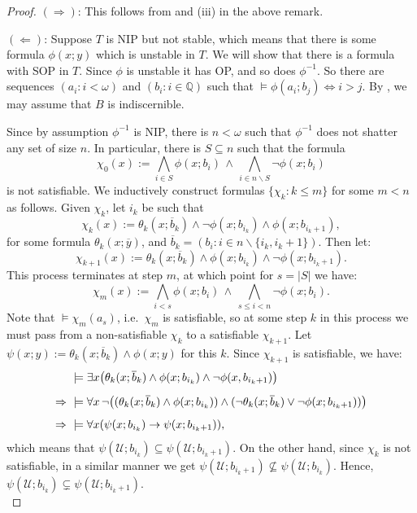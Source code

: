 \documentclass[a4paper]{report}
\newcommand{\Q}{\mathbb{Q}}
\newcommand{\U}{\mathcal{U}}
\newcommand{\y}{\overline{y}}
\renewcommand{\b}{\overline{b}}
\renewcommand{\implies}{\Rightarrow}
\newcommand{\simplies}{\rightarrow}
\renewcommand{\iff}{\Leftrightarrow}
\theoremstyle{definition}
\theoremstyle{remstyle}
\begin{document}
\begin{proof}
	$(\implies)$: This follows from  and (iii) in the above remark.

	$(\Leftarrow)$: Suppose $T$ is NIP but not stable, which means that there is some formula $\phi(x;y)$ which is unstable in $T$. We will show that there is a formula with SOP in $T$. Since $\phi$ is unstable it has OP, and so does $\phi^{-1}$. So there are sequences $(a_i:i<\omega)$ and $(b_i:i\in \Q)$ such that $\models \phi(a_i;b_j)\iff i>j$. By , we may assume that $B$ is indiscernible.

	Since by assumption $\phi^{-1}$ is NIP, there is $n<\omega$ such that $\phi^{-1}$ does not shatter any set of size $n$. In particular, there is $S\subseteq n$ such that the formula
	\begin{equation*}
		\chi_0(x) := \bigwedge_{i\in S}\phi(x;b_i)\, \wedge\, \bigwedge_{i\in n\backslash S} \neg\phi(x;b_i)
	\end{equation*}
	is not satisfiable. We inductively construct formulas $\{\chi_k:k\leq m\}$ for some $m<n$ as follows. Given $\chi_k$, let $i_k$ be such that
	\begin{equation*}
		\chi_k(x) := \theta_k(x;\b_k)\wedge \neg\phi(x;b_{i_k}) \wedge \phi(x;b_{i_k+1}),
	\end{equation*}
	for some formula $\theta_k(x;\y)$, and $\b_k=(b_i:i\in n\backslash\{i_k,i_k+1\})$. Then let:
	\begin{equation*}
		\chi_{k+1}(x) := \theta_k(x;\b_k)\wedge \phi(x;b_{i_k}) \wedge \neg\phi(x;b_{i_k+1}).
	\end{equation*}
	This process terminates at step $m$, at which point for $s=|S|$ we have:
	\begin{equation*}
		\chi_m(x) := \bigwedge_{i< s} \phi(x;b_i)\, \wedge\, \bigwedge_{s\leq i<n}\neg\phi(x;b_i).
	\end{equation*}
	Note that $\models\chi_m(a_s)$, i.e.\ $\chi_m$ is satisfiable, so at some step $k$ in this process we must pass from a non-satisfiable $\chi_k$ to a satisfiable $\chi_{k+1}$. Let $\psi(x;y) :=\theta_k(x;\b_k)\wedge\phi(x;y)$ for this $k$. Since $\chi_{k+1}$ is satisfiable, we have:
	\begin{equation*}
		\setlength{\jot}{\topsep}
		\begin{aligned}
			           & \models \exists x\big(\theta_k(x;\b_k)\wedge\phi(x;b_{i_k})\wedge\neg\phi(x,b_{i_k+1})\big)                                   \\
			\implies\  & \models \forall x\,\neg\big((\theta_k(x;\b_k)\wedge\phi(x;b_{i_k}))\wedge(\neg\theta_k(x;\b_k)\vee\neg\phi(x;b_{i_k+1}))\big) \\
			\implies\  & \models \forall x(\psi(x;b_{i_k})\simplies\psi(x;b_{i_k+1})),
		\end{aligned}
	\end{equation*}
	which means that $\psi(\U;b_{i_k}) \subseteq \psi(\U;b_{i_k+1})$. On the other hand, since $\chi_{k}$ is not satisfiable, in a similar manner we get $\psi(\U;b_{i_k+1}) \not\subseteq \psi(\U;b_{i_k})$. Hence, $\psi(\U;b_{i_k}) \subsetneq \psi(\U;b_{i_k+1})$.\\


\end{proof}
\end{document}
